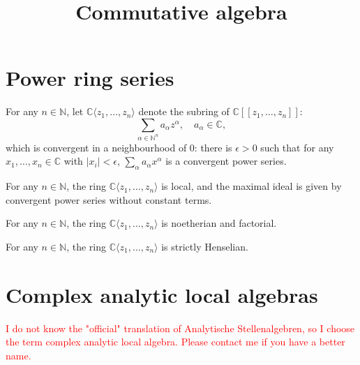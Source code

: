 






\title{Commutative algebra}







\maketitle


\tableofcontents



\section{Power ring series}

\begin{definition}
    For any $n\in \mathbb{N}$, let $\mathbb{C}\langle z_1,\ldots,z_n\rangle$ denote the subring of $\mathbb{C}[[z_1,\ldots,z_n]]$:
    \[
        \sum_{\alpha\in \mathbb{N}^n} a_{\alpha}z^{\alpha},\quad a_{\alpha}\in \mathbb{C},
    \]
    which is  convergent in a neighbourhood of $0$: there is $\epsilon>0$ such that for any $x_1,\ldots,x_n\in \mathbb{C}$ with $|x_i|<\epsilon$, $\sum_{\alpha}a_{\alpha} x^{\alpha}$ is a convergent power series.
\end{definition}

\begin{theorem}
    For any $n\in \mathbb{N}$, the ring $\mathbb{C}\langle z_1,\ldots,z_n \rangle$ is local, and the maximal ideal is given by convergent power series without constant terms.
\end{theorem}

\begin{theorem}
    For any $n\in \mathbb{N}$, the ring $\mathbb{C}\langle z_1,\ldots,z_n \rangle$ is noetherian and factorial.
\end{theorem}

\begin{theorem}
    For any $n\in \mathbb{N}$, the ring $\mathbb{C}\langle z_1,\ldots,z_n \rangle$ is strictly Henselian.
\end{theorem}

\section{Complex analytic local algebras}
\textcolor{red}{I do not know the "official" translation of Analytische Stellenalgebren, so I choose the term complex analytic local algebra. Please contact me if you have a better name.}

